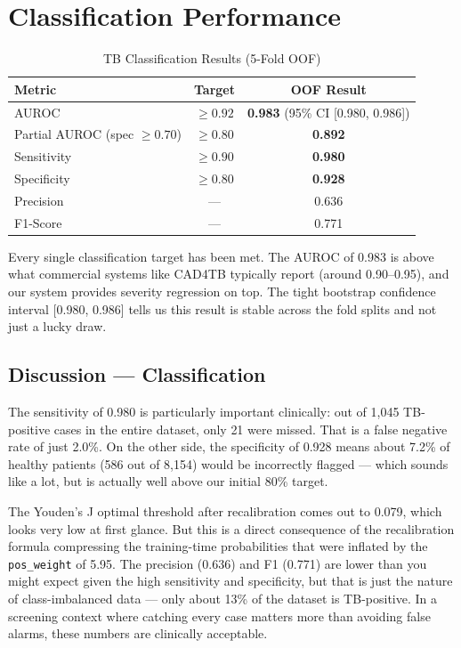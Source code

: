 \documentclass[12pt]{report}
\begin{document}
\section{Classification Performance}

\begin{table}[H]
\centering
\caption{TB Classification Results (5-Fold OOF)}
\label{tab:cls_results}
\renewcommand{\arraystretch}{1.2}
\begin{tabular}{|l|c|c|}
\hline
\textbf{Metric} & \textbf{Target} & \textbf{OOF Result} \\
\hline
AUROC & $\geq 0.92$ & \textbf{0.983} (95\% CI [0.980, 0.986]) \\
Partial AUROC (spec $\geq 0.70$) & $\geq 0.80$ & \textbf{0.892} \\
Sensitivity & $\geq 0.90$ & \textbf{0.980} \\
Specificity & $\geq 0.80$ & \textbf{0.928} \\
Precision & --- & 0.636 \\
F1-Score & --- & 0.771 \\
\hline
\end{tabular}
\end{table}

Every single classification target has been met. The AUROC of 0.983 is above what commercial systems like CAD4TB typically report (around 0.90--0.95), and our system provides severity regression on top. The tight bootstrap confidence interval [0.980, 0.986] tells us this result is stable across the fold splits and not just a lucky draw.

\subsection{Discussion --- Classification}

The sensitivity of 0.980 is particularly important clinically: out of 1,045 TB-positive cases in the entire dataset, only 21 were missed. That is a false negative rate of just 2.0\%. On the other side, the specificity of 0.928 means about 7.2\% of healthy patients (586 out of 8,154) would be incorrectly flagged --- which sounds like a lot, but is actually well above our initial 80\% target.

The Youden's J optimal threshold after recalibration comes out to 0.079, which looks very low at first glance. But this is a direct consequence of the recalibration formula compressing the training-time probabilities that were inflated by the \texttt{pos\_weight} of 5.95. The precision (0.636) and F1 (0.771) are lower than you might expect given the high sensitivity and specificity, but that is just the nature of class-imbalanced data --- only about 13\% of the dataset is TB-positive. In a screening context where catching every case matters more than avoiding false alarms, these numbers are clinically acceptable.
\end{document}

